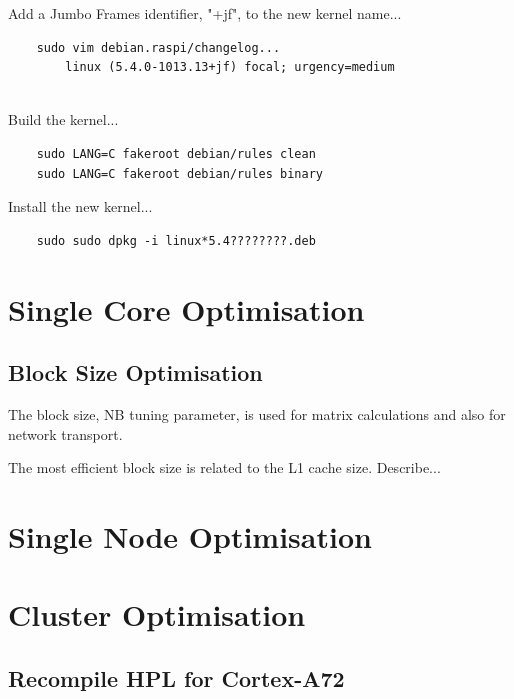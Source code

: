 \documentclass{article}
\begin{document}
Add a Jumbo Frames identifier, "+jf", to the new kernel name...

\begin{verbatim}
    sudo vim debian.raspi/changelog...
        linux (5.4.0-1013.13+jf) focal; urgency=medium
        
\end{verbatim}

Build the kernel...

\begin{verbatim}
    sudo LANG=C fakeroot debian/rules clean
    sudo LANG=C fakeroot debian/rules binary
\end{verbatim}

Install the new kernel...

\begin{verbatim}
    sudo sudo dpkg -i linux*5.4????????.deb
\end{verbatim}





%
%
\section{Single Core Optimisation}

\subsection{Block Size Optimisation}

The block size, NB tuning parameter, is used for matrix calculations and also for network transport.

The most efficient block size is related to the L1 cache size. Describe...


%
%
\section{Single Node Optimisation}


%
%
\section{Cluster Optimisation}




\subsection{Recompile HPL for Cortex-A72}
\end{document}
